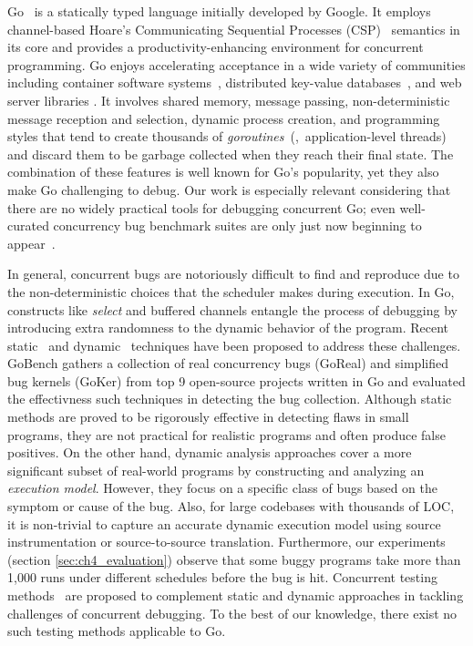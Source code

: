 Go~\cite{go} is a statically typed language initially developed by Google.
%
It employs channel-based Hoare's Communicating Sequential Processes (CSP)~\cite{hoare-csp78} semantics in its core and provides a productivity-enhancing environment for concurrent programming.
%
Go enjoys accelerating acceptance in a wide variety of
communities including container software systems~\cite{merkel2014docker,kubernetes},  distributed key-value databases~\cite{etcd,cockroachdb-sigmod20}, and web server libraries \cite{grpc}.
%
It involves shared memory, message passing, non-deterministic message reception and selection, dynamic process creation, and programming styles that tend to create thousands of \textit{goroutines}~(\ie,~application-level threads) and discard them to be garbage collected when they reach their final state.
%
The combination of these features is well known for Go's popularity, yet they also make Go challenging to debug.
%
Our work is especially relevant considering that there are no widely practical tools for debugging concurrent Go; even well-curated
concurrency bug benchmark suites are only just now beginning to appear~\cite{tu-concurrentBugs-asplos19,yuan-gobench-cgo21}.
%

In general, concurrent bugs are notoriously difficult to find and reproduce due to the non-deterministic choices that the scheduler makes during execution.
%
In Go, constructs like \textit{select} and buffered channels entangle the process of debugging by introducing extra randomness to the dynamic behavior of the program.
%
Recent static~\cite{ng-dl-cc16,stadtmuller-minigo-aplas16,lange-fence-popl17,lange-staticType-icse18} and dynamic~\cite{go-race-blog,zhao-occam97,sulzmann-corr17,sulzmann-twophase-2018,dilley-gomela-corr2020} techniques have been proposed to address these challenges.
%
GoBench \cite{yuan-gobench-cgo21} gathers a collection of real concurrency bugs (GoReal) and simplified bug kernels (GoKer) from top 9 open-source projects written in Go and evaluated the effectivness such techniques in detecting the bug collection.
%
Although static methods are proved to be rigorously effective in detecting flaws in small programs, they are not practical for realistic programs and often produce false positives.
%
On the other hand, dynamic analysis approaches cover a more significant subset of real-world programs by constructing and analyzing an \textit{execution model}.
%
However, they focus on a specific class of bugs based on the symptom or cause of the bug.
%
Also, for large codebases with thousands of LOC, it is non-trivial to capture an accurate dynamic execution model using source instrumentation or source-to-source translation.
%
Furthermore, our experiments (section \ref{sec:ch4_evaluation}) observe that some buggy programs take more than 1,000 runs under different schedules before the bug is hit.
%
Concurrent testing methods~\cite{arora-concrrentTesting-16} are proposed to complement static and dynamic approaches in tackling challenges of concurrent debugging.
%
To the best of our knowledge, there exist no such testing methods applicable to Go.
%

